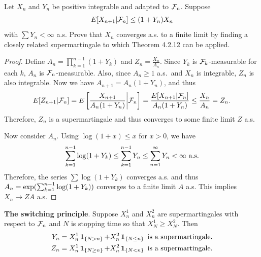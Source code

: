 \documentclass[a4paper]{article}
\begin{document}
\begin{ex}[Durret 4.2.8]
  Let $X_n$ and $Y_n$ be positive integrable and adapted to $\mathcal{F}_n$.
  Suppose
  \[
    E[X_{n + 1} | \mathcal{F}_n] \leq (1 + Y_n) X_n
  \]
  with $\sum Y_n < \infty$ a.s. Prove that $X_n$ converges a.s. to a finite
  limit by finding a closely related supermartingale to which
  Theorem 4.2.12 can be applied.
\end{ex}

\begin{proof}
  Define $A_n = \prod_{k=1}^{n-1} (1 + Y_k)$ and $Z_n = \frac{X_n}{A_n}$.
  Since $Y_k$ is $\mathcal{F}_k$-measurable for each $k$, $A_n$ is
  $\mathcal{F}_n$-measurable.
  Also, since $A_n \geq 1$ a.s.\ and $X_n$
  is integrable, $Z_n$ is also integrable. Now we have
  $A_{n + 1} = A_n (1 + Y_n)$, and thus
  \begin{align*}
    E[Z_{n + 1} | \mathcal{F}_n]
    = E \left[ \frac{X_{n + 1}}{A_n (1 + Y_n)} \middle| \mathcal{F}_n \right]
    = \frac{E[X_{n + 1} | \mathcal{F}_n]}{A_n (1 + Y_n)}
    \leq \frac{X_n}{A_n}
    = Z_n.
  \end{align*}
  Therefore, $Z_n$ is a supermartingale and thus converges to some
  finite limit $Z$ a.s.

  Now consider $A_n$. Using $\log (1 + x) \leq x$ for $x > 0$, we have
  \[
    \sum_{k=1}^{n-1} \log (1 + Y_k)
    \leq \sum_{k=1}^{n - 1} Y_n
    \leq \sum_{n=1}^\infty Y_n < \infty \text{ a.s.}
  \]
  Therefore, the series $\sum \log(1 + Y_k)$ converges a.s.
  and thus $A_n = \exp (\sum_{k=1}^{n-1} \log(1 + Y_k))$ converges
  to a finite limit $A$ a.s. This implies $X_n \to Z A$ a.s.

\end{proof}

\begin{ex}[Durret 4.2.9]
  \textbf{The switching principle}. Suppose $X_n^1$ and $X_n^2$ are
  supermartingales with respect to $\mathcal{F}_n$ and $N$ is stopping time
  so that $X_N^1 \geq X_N^2$. Then
  \begin{align*}
    Y_n = X_n^1 \operatorname{\mathbf{1}}_{\{N > n\}} + X_n^2 \operatorname{\mathbf{1}}_{\{N \leq n\}}
    \text{ is a supermartingale.} \\
    Z_n = X_n^1 \operatorname{\mathbf{1}}_{\{N \geq n\}} + X_n^2 \operatorname{\mathbf{1}}_{\{N < n\}}
    \text{ is a supermartingale.} \\
  \end{align*}
\end{ex}
\end{document}
